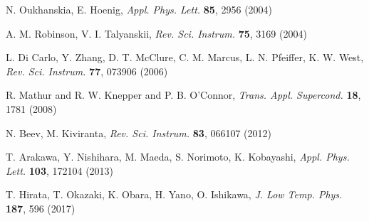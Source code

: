 \documentclass{twocol}
\begin{document}
\begin{thebibliography}{}
N. Oukhanskia, E. Hoenig,
\textit{Appl. Phys. Lett.} {\bf 85}, 2956 (2004)

A. M. Robinson, V. I. Talyanskii,
\textit{Rev. Sci. Instrum.} {\bf 75}, 3169 (2004)

L. Di Carlo, Y. Zhang, D. T. McClure, C. M. Marcus, L. N. Pfeiffer, K. W. West,
\textit{Rev. Sci. Instrum.} {\bf 77}, 073906 (2006)

R. Mathur and R. W. Knepper and P. B. O'Connor,
\textit{Trans. Appl. Supercond.} {\bf 18}, 1781 (2008)

N. Beev, M. Kiviranta,
\textit{Rev. Sci. Instrum.} {\bf 83}, 066107 (2012)

T. Arakawa, Y. Nishihara, M. Maeda, S. Norimoto, K. Kobayashi,
\textit{Appl. Phys. Lett.} {\bf 103}, 172104 (2013)


T. Hirata, T. Okazaki, K. Obara, H. Yano, O. Ishikawa,
\textit{J. Low Temp. Phys.} {\bf 187}, 596 (2017)



\end{thebibliography}
\end{document}

